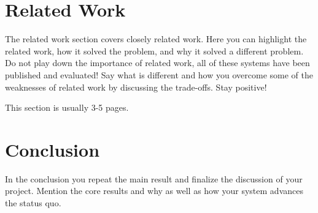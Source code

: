 \documentclass[a4paper,11pt,oneside]{report}
\begin{document}
\chapter{Related Work}

The related work section covers closely related work. Here you can highlight
the related work, how it solved the problem, and why it solved a different
problem. Do not play down the importance of related work, all of these
systems have been published and evaluated! Say what is different and how
you overcome some of the weaknesses of related work by discussing the 
trade-offs. Stay positive!

This section is usually 3-5 pages.



\chapter{Conclusion}

In the conclusion you repeat the main result and finalize the discussion of
your project. Mention the core results and why as well as how your system
advances the status quo.

\cleardoublepage
{}
{}
\printbibliography

%
%
\end{document}
